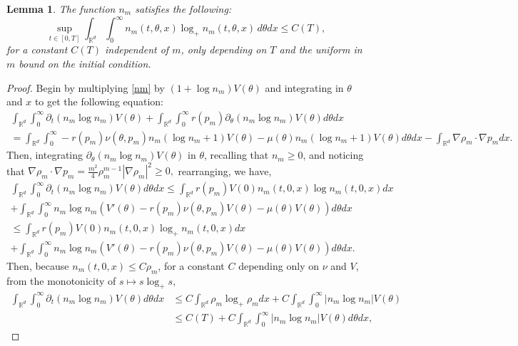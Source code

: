 \documentclass[10pt,a4paper]{amsart}
\newtheorem{lemma}{Lemma}
\def\R{\mathbb R}
\begin{document}
\begin{lemma}\label{lem.nlogn}
    The function $n_m$ satisfies the following:
    \begin{equation}\label{nlogn}
        \sup_{t \in [0,T]}\int_{\R^d}\int_{0}^{\infty}n_m(t,\theta,x)\log_{+}n_m(t,\theta,x)\,d\theta dx \leq C(T),
    \end{equation}
    for a constant $C(T)$ independent of $m$, only depending on $T$ and the uniform in $m$ bound on the initial condition.
\end{lemma}

\begin{proof}
    Begin by multiplying \eqref{nm} by $(1+\log n_m)V(\theta)$ and integrating in $\theta$ and $x$ to get the following equation:
    \begin{multline*}
    \int_{\R^d}\int_{0}^{\infty}\partial_t (n_m \log n_m)V(\theta)+\int_{\R^d}\int_{0}^{\infty}r(p_m)\partial_\theta(n_m \log n_m)V(\theta)d\theta dx\\=
    \int_{\R^d}\int_{0}^{\infty}-r(p_m)\nu(\theta,p_m)n_m(\log n_m+1)V(\theta)-\mu(\theta)n_m(\log n_m+1)V(\theta)d\theta dx -\int_{\R^d}\nabla \rho_m \cdot \nabla p_m dx.
    \end{multline*}
    Then, integrating $\partial_\theta (n_m \log n_m)V(\theta)$ in $\theta$, recalling that $n_m \geq 0$, and noticing that $\nabla \rho_m \cdot \nabla p_m =\frac{m^2}{4}\rho_m^{m-1}|\nabla \rho_m|^2 \geq 0,$ rearranging, we have,
    \begin{multline*}
        \int_{\R^d}\int_{0}^{\infty}\partial_t (n_m \log n_m)V(\theta)d\theta dx \leq \int_{\R^d}r(p_m)V(0)n_m(t,0,x)\log n_m (t,0,x)dx\\+\int_{\R^d}\int_{0}^{\infty}n_m \log n_m (V'(\theta)-r(p_m)\nu(\theta,p_m)V(\theta)-\mu(\theta)V(\theta))d\theta dx \\
         \leq \int_{\R^d}r(p_m)V(0)n_m(t,0,x)\log_+ n_m (t,0,x)dx\\+\int_{\R^d}\int_{0}^{\infty}n_m \log n_m (V'(\theta)-r(p_m)\nu(\theta,p_m)V(\theta)-\mu(\theta)V(\theta))d\theta dx .
    \end{multline*}
   Then, because $n_m(t,0,x)\leq C\rho_m$, for a constant $C$ depending only on $\nu$ and $V$, from the monotonicity of $s \mapsto s\log_+ s,$
   \begin{align*}
   \int_{\R^d}\int_{0}^{\infty}\partial_t(n_m \log n_m)V(\theta)d\theta dx &\leq C\int_{\R^d} \rho_m \log_+ \rho_mdx +C\int_{\R^d}\int_{0}^{\infty}|n_m \log n_m|V(\theta) \\&\leq C(T)+C\int_{\R^d}\int_{0}^{\infty}|n_m \log n_m|V(\theta)d\theta dx,

\end{align*}
\end{proof}
\end{document}
